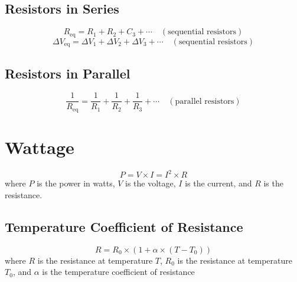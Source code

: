 \documentclass{article}
\begin{document}
\subsection*{Resistors in Series}

\[R_\text{eq}=R_1 + R_2 + C_3 + \cdots\quad (\text{sequential resistors})\]
\[\Delta V_\text{eq}=\Delta V_1 + \Delta V_2 + \Delta V_3 + \cdots\quad (\text{sequential resistors})\]

\subsection*{Resistors in Parallel}

\[\frac{1}{R_\text{eq}}=\frac{1}{R_1} + \frac{1}{R_2} + \frac{1}{R_3} + \cdots\quad (\text{parallel resistors})\]

\section*{Wattage}
\[P=V\times I=I^2 \times R\] where $P$ is the power in watts, $V$ is the voltage, $I$ is the current, and $R$ is the resistance.

\subsection*{Temperature Coefficient of Resistance}
\[R=R_0\times (1+\alpha \times (T-T_0))\]
where $R$ is the resistance at temperature $T$, $R_0$ is the resistance at temperature $T_0$, and $\alpha$ is the temperature coefficient of resistance
\end{document}
